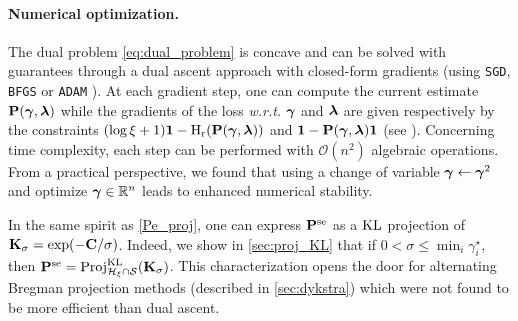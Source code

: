 \paragraph{Numerical optimization.} The dual problem \eqref{eq:dual_problem} is concave and can be solved with guarantees through a dual ascent approach with closed-form gradients (using \eg \texttt{SGD}, \texttt{BFGS} \cite{liu1989limited} or \texttt{ADAM} \cite{kingma2014adam}).
At each gradient step, one can compute the current estimate $\mathbf{P}(\bm{\gamma}, \bm{\lambda})$ while the gradients of the loss \textit{w.r.t.} $\boldsymbol{\gamma}$ and $\boldsymbol{\lambda}$ are given respectively by the constraints $(\log{\xi}+1)
\bm{1} - \operatorname{H}_{\mathrm{r}}(\mathbf{P}(\bm{\gamma}, \bm{\lambda}))$ and $ \bm{1} - \mathbf{P}(\bm{\gamma}, \bm{\lambda}) \bm{1}$ (see \eg \cite[Proposition 6.1.1]{bertsekas1997nonlinear}).
Concerning time
complexity, each step can be performed with $\mathcal{O}(n^2)$ algebraic
operations. From a practical perspective, we found that using a change of variable $\boldsymbol{\gamma} \leftarrow \boldsymbol{\gamma}^2$ and optimize $\boldsymbol{\gamma} \in \mathbb{R}^n$ leads to enhanced numerical stability.

\begin{remark}
  In the same spirit as \cref{Pe_proj}, one can express $\mathbf{P}^{\mathrm{se}}$ as a $\operatorname{KL}$ projection of $\mathbf{K}_{\sigma} = \exp(-\mathbf{C}/\sigma)$.
  Indeed, we show in \cref{sec:proj_KL} that if $0 < \sigma \leq \min_i \gamma^\star_i$, then $\mathbf{P}^{\mathrm{se}} = \operatorname{Proj}^{\operatorname{\operatorname{KL}}}_{\mathcal{H}_{\xi} \cap
  \mathcal{S}}(\mathbf{K}_{\sigma})$. This characterization opens the door for alternating Bregman projection methods (described in \cref{sec:dykstra}) which were not found to be more efficient than dual ascent.
\end{remark}

